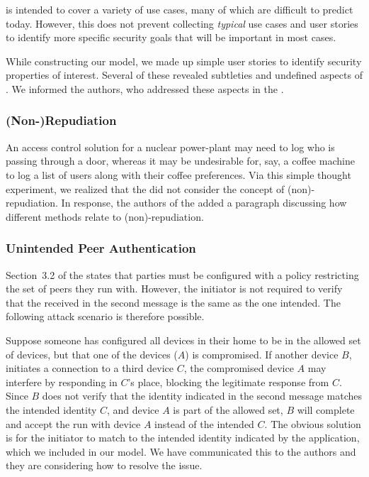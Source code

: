 \documentclass[runningheads]{llncs}
\begin{document}
\mEdhoc{} is intended to cover a variety of use cases, many of which are
difficult to predict today.
%
However, this does not
prevent collecting \emph{typical} use cases and user stories
to identify more specific security goals that will be important in most cases.
%

While constructing our model, we made up simple user stories to identify
security properties of interest.
%
Several of these revealed subtleties and undefined aspects of \mEdhoc{}.
%
We informed the \mEdhoc{} authors, who addressed these aspects in the
\mSpec{}.
%

\subsubsection{(Non-)Repudiation}
An access control solution for a nuclear power-plant may need to log who is
passing through a door, whereas it may be undesirable for, say, a coffee
machine to log a list of users along with their coffee preferences.
%
Via this simple thought experiment, we realized that the \mSpec{} did not
consider the concept of (non)-repudiation.
%
In response, the authors of the \mSpec{} added a paragraph discussing how
different methods relate to (non)-repudiation.

\subsubsection{Unintended Peer Authentication}
Section~3.2 of the \mSpec{} states that parties must be configured
with a policy restricting the set of peers they run \mEdhoc{} with.
%
However, the initiator is not required to verify that the \mIdcredr{} received
in the second message is the same as the one intended.
%
The following attack scenario is therefore possible.
%

Suppose someone has configured all devices in their home to be in the
allowed set of devices, but that one of the devices ($A$) is compromised.
%
If another device $B$, initiates a connection to a third device $C$, the
compromised device $A$ may interfere by responding in $C$'s place, blocking
the legitimate response from $C$.
%
Since $B$ does not verify that the identity indicated in the second message
matches the intended identity $C$, and device $A$ is part of the allowed set,
$B$ will complete and accept the \mEdhoc{} run with device $A$ instead of the
intended $C$.
%
The obvious solution is for the initiator to match \mIdcredr{} to the intended
identity indicated by the application, which we included in our model.
%
We have communicated this to the \mEdhoc{} authors and they are considering
how to resolve the issue.
%
\end{document}
